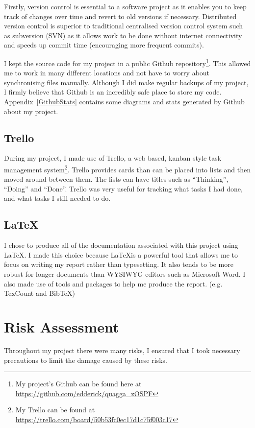 \documentclass[12pt]{report}
\begin{document}
 Firstly, version control
is essential to a software project as it enables you to keep track of changes
over time and revert to old versions if necessary. Distributed version control
is superior to traditional centralised version control system such as subversion
(SVN) as it allows work to be done without internet connectivity and speeds up
commit time (encouraging more frequent commits). 

I kept the source code for my project in a public Github repository\footnote{My
project's Github can be found here at
\url{https://github.com/edderick/quagga\_zOSPF}}. This allowed me to work in
many different locations and not have to worry about synchronising files
manually. Although I did make regular backups of my project, I firmly believe
that Github is an incredibly safe place to store my code.
Appendix~\ref{GithubStats} contains some diagrams and stats generated by Github
about my project. 

\subsection{Trello}
During my project, I made use of Trello, a web based, kanban style task
management system\footnote{My Trello can be found at
\url{https://trello.com/board/50b53fc0ec17d1c75f003c17}}.
Trello provides cards than can be placed into lists and then moved around
between them. The lists can have titles such as ``Thinking'', ``Doing'' and
``Done''. Trello was very useful for tracking what tasks I had done, and what
tasks I still needed to do. 

\subsection{\LaTeX}
I chose to produce all of the documentation associated with this project using
\LaTeX. I made this choice because \LaTeX is a powerful tool that allows me to
focus on writing my report rather than typesetting. It also tends to be more
robust for longer documents than WYSIWYG editors such as Microsoft Word. I also
made use of tools and packages to help me produce the report. (e.g. TexCount
and BibTeX)

\section{Risk Assessment}
Throughout my project there were many risks, I ensured that I took necessary
precautions to limit the damage caused by these risks.
\end{document}
